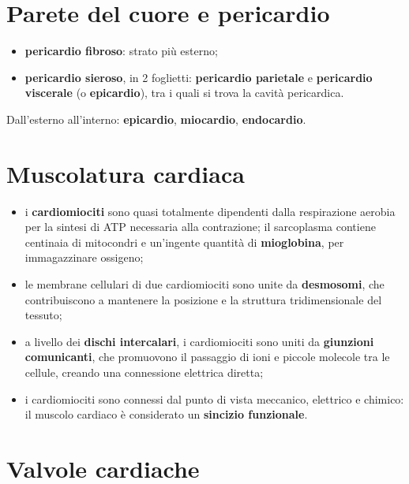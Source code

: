 \section{Parete del cuore e pericardio}

\begin{itemize}
  \item \textbf{pericardio fibroso}: strato più esterno;
  \item \textbf{pericardio sieroso}, in 2 foglietti: \textbf{pericardio parietale} e
    \textbf{pericardio viscerale} (o \textbf{epicardio}), tra i quali si trova la cavità
    pericardica.
\end{itemize}

Dall'esterno all'interno: \textbf{epicardio}, \textbf{miocardio}, \textbf{endocardio}.

\section{Muscolatura cardiaca}

\begin{itemize}
  \item i \textbf{cardiomiociti} sono quasi totalmente dipendenti dalla respirazione aerobia per
    la sintesi di ATP necessaria alla contrazione; il sarcoplasma contiene centinaia di
    mitocondri e un'ingente quantità di \textbf{mioglobina}, per immagazzinare ossigeno;
  \item le membrane cellulari di due cardiomiociti sono unite da \textbf{desmosomi}, che
    contribuiscono a mantenere la posizione e la struttura tridimensionale del tessuto;
  \item a livello dei \textbf{dischi intercalari}, i cardiomiociti sono uniti da \textbf{giunzioni
    comunicanti}, che promuovono il passaggio di ioni e piccole molecole tra le cellule, creando
    una connessione elettrica diretta;
  \item i cardiomiociti sono connessi dal punto di vista meccanico, elettrico e chimico: il
    muscolo cardiaco è considerato un \textbf{sincizio funzionale}.
\end{itemize}

\section{Valvole cardiache}


